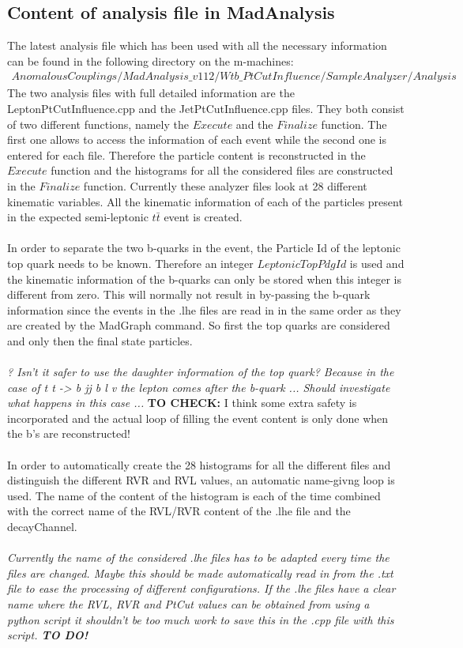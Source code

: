 \subsection{Content of analysis file in MadAnalysis}
The latest analysis file which has been used with all the necessary information can be found in the following directory on the m-machines:
\begin{eqnarray*}
  AnomalousCouplings/MadAnalysis\_v112/Wtb\_PtCutInfluence/SampleAnalyzer/Analysis 
\end{eqnarray*}
The two analysis files with full detailed information are the LeptonPtCutInfluence.cpp and the JetPtCutInfluence.cpp files.
They both consist of two different functions, namely the $Execute$ and the $Finalize$ function. The first one allows to access the information of each event while the second one is entered for each file.
Therefore the particle content is reconstructed in the $Execute$ function and the histograms for all the considered files are constructed in the $Finalize$ function.
Currently these analyzer files look at 28 different kinematic variables. All the kinematic information of each of the particles present in the expected semi-leptonic $t\bar{t}$ event is created.\\
\\
In order to separate the two b-quarks in the event, the Particle Id of the leptonic top quark needs to be known. Therefore an integer $LeptonicTopPdgId$ is used and the kinematic information of the b-quarks can only be stored when this integer is different from zero.
This will normally not result in by-passing the b-quark information since the events in the .lhe files are read in in the same order as they are created by the MadGraph command. So first the top quarks are considered and only then the final state particles.\\
\\
\textit{? Isn't it safer to use the daughter information of the top quark? Because in the case of t t -> b jj b l v the lepton comes after the b-quark ... Should investigate what happens in this case ...} \textbf{TO CHECK: } I think some extra safety is incorporated and the actual loop of filling the event content is only done when the b's are reconstructed!\\
\\
In order to automatically create the 28 histograms for all the different files and distinguish the different RVR and RVL values, an automatic name-givng loop is used. The name of the content of the histogram is each of the time combined with the correct name of the RVL/RVR content of the .lhe file and the decayChannel.\\
\\
\textit{Currently the name of the considered .lhe files has to be adapted every time the files are changed. Maybe this should be made automatically read in from the .txt file to ease the processing of different configurations. If the .lhe files have a clear name where the RVL, RVR and PtCut values can be obtained from using a python script it shouldn't be too much work to save this in the .cpp file with this script. \textbf{TO DO!}}

